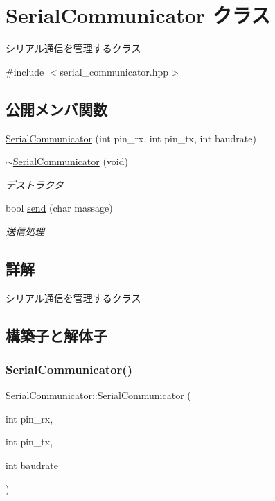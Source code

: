 \hypertarget{class_serial_communicator}{}\section{Serial\+Communicator クラス}
\label{class_serial_communicator}


シリアル通信を管理するクラス  




{\ttfamily \#include $<$serial\+\_\+communicator.\+hpp$>$}

\subsection*{公開メンバ関数}
\begin{DoxyCompactItemize}
\item 
\mbox{\hyperlink{class_serial_communicator_ac3f793f4b7e9624915921f5c6922159b}{Serial\+Communicator}} (int pin\+\_\+rx, int pin\+\_\+tx, int baudrate)
\item 
\mbox{\hyperlink{class_serial_communicator_a591630c3e832911a8054658e21d3be5a}{$\sim$\+Serial\+Communicator}} (void)
\begin{DoxyCompactList}\small\item\em デストラクタ \end{DoxyCompactList}\item 
bool \mbox{\hyperlink{class_serial_communicator_add5f2442d225ecc542f4b8c58a970281}{send}} (char massage)
\begin{DoxyCompactList}\small\item\em 送信処理 \end{DoxyCompactList}\end{DoxyCompactItemize}


\subsection{詳解}
シリアル通信を管理するクラス 

\subsection{構築子と解体子}
\mbox{\label{class_serial_communicator_ac3f793f4b7e9624915921f5c6922159b}} 
\subsubsection{\texorpdfstring{SerialCommunicator()}{SerialCommunicator()}}
{\footnotesize\ttfamily Serial\+Communicator\+::\+Serial\+Communicator (\begin{DoxyParamCaption}\item[{int}]{pin\+\_\+rx,  }\item[{int}]{pin\+\_\+tx,  }\item[{int}]{baudrate }\end{DoxyParamCaption})}

